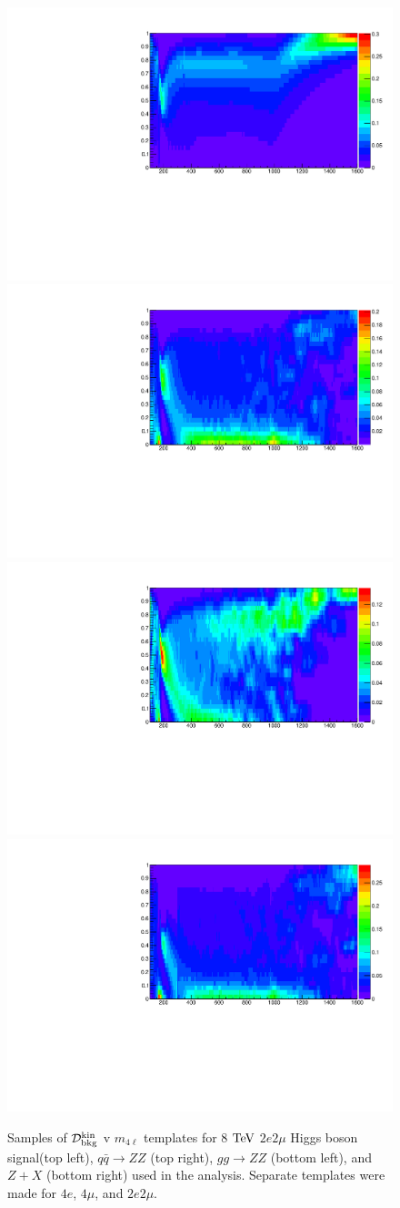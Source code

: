 \begin{figure}[htbp]
\begin{center}
\includegraphics[width=.4\linewidth]{HiggsDiscovery/figures/Dsignal_2e2mu.pdf}
\includegraphics[width=.4\linewidth]{HiggsDiscovery/figures/Dbackground_qqZZ_2e2mu.pdf} \\
\includegraphics[width=.4\linewidth]{HiggsDiscovery/figures/Dbackground_ggZZ_2e2mu.pdf}
\includegraphics[width=.4\linewidth]{HiggsDiscovery/figures/Dbackground_ZX_2e2mu.pdf}
\caption[Templates of Kinematic Discriminant for $H \rightarrow ZZ \rightarrow 4\ell$]{Samples of $\mathcal{D}_{\rm{bkg}}^{\rm{kin}}$ v $m_{4\ell}$ templates for 8 $\rm{TeV}$ $2e2\mu$ Higgs boson signal(top left), $q\bar{q}\rightarrow ZZ$ (top right), $gg\rightarrow ZZ$ (bottom left), and $Z+X$ (bottom right) used in the analysis. Separate templates were made for $4e$, $4\mu$, and $2e2\mu$.}
\label{fig:MELATemplates}
\end{center}
\end{figure}

